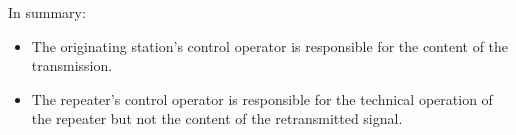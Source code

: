 In summary:
\begin{itemize}
    \item The originating station’s control operator is responsible for the content of the transmission.
    \item The repeater’s control operator is responsible for the technical operation of the repeater but not the content of the retransmitted signal.
\end{itemize}

